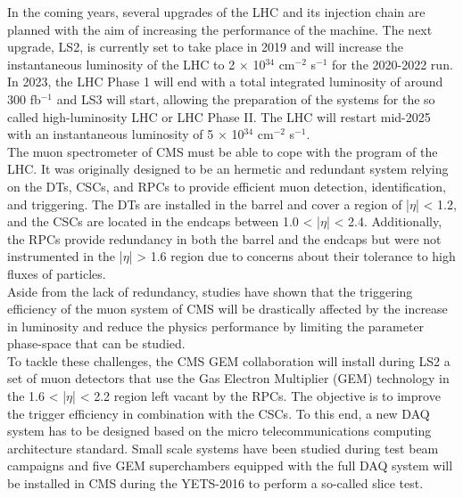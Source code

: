 In the coming years, several upgrades of the LHC and its injection chain are planned with the aim of increasing the performance of the machine. The next upgrade, LS2, is currently set to take place in 2019 and will increase the instantaneous luminosity of the LHC to 2 $ \times $ 10$^{34}$ cm$^{-2}$ s$^{-1}$ for the 2020-2022 run. In 2023, the LHC Phase 1 will end with a total integrated luminosity of around 300 fb$^{-1}$ and LS3 will start, allowing the preparation of the systems for the so called high-luminosity LHC or LHC Phase II. The LHC will restart mid-2025 with an instantaneous luminosity of 5 $ \times $ 10$^{34}$ cm$^{-2}$ s$^{-1}$. \\

The muon spectrometer of CMS must be able to cope with the program of the LHC. It was originally designed to be an hermetic and redundant system relying on the DTs, CSCs, and RPCs to provide efficient muon detection, identification, and triggering. The DTs are installed in the barrel and cover a region of |$\eta$| < 1.2, and the CSCs are located in the endcaps between 1.0 < |$\eta$| < 2.4. Additionally, the RPCs provide redundancy in both the barrel and the endcaps but were not instrumented in the |$\eta$| > 1.6 region due to concerns about their tolerance to high fluxes of particles. \\

Aside from the lack of redundancy, studies have shown that the triggering efficiency of the muon system of CMS will be drastically affected by the increase in luminosity and reduce the physics performance by limiting the parameter phase-space that can be studied. \\

To tackle these challenges, the CMS GEM collaboration \cite{Colaleo:2021453} will install during LS2 a set of muon detectors that use the Gas Electron Multiplier (GEM) technology in the 1.6 < |$\eta$| < 2.2 region left vacant by the RPCs. The objective is to improve the trigger efficiency in combination with the CSCs. To this end, a new DAQ system has to be designed based on the micro telecommunications computing architecture standard. Small scale systems have been studied during test beam campaigns and five GEM superchambers equipped with the full DAQ system will be installed in CMS during the YETS-2016 to perform a so-called slice test. \\

